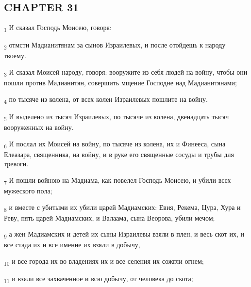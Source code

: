 \subsection{CHAPTER 31}
\begin{tcolorbox}
\textsubscript{1} И сказал Господь Моисею, говоря:
\end{tcolorbox}
\begin{tcolorbox}
\textsubscript{2} отмсти Мадианитянам за сынов Израилевых, и после отойдешь к народу твоему.
\end{tcolorbox}
\begin{tcolorbox}
\textsubscript{3} И сказал Моисей народу, говоря: вооружите из себя людей на войну, чтобы они пошли против Мадианитян, совершить мщение Господне над Мадианитянами;
\end{tcolorbox}
\begin{tcolorbox}
\textsubscript{4} по тысяче из колена, от всех колен Израилевых пошлите на войну.
\end{tcolorbox}
\begin{tcolorbox}
\textsubscript{5} И выделено из тысяч Израилевых, по тысяче из колена, двенадцать тысяч вооруженных на войну.
\end{tcolorbox}
\begin{tcolorbox}
\textsubscript{6} И послал их Моисей на войну, по тысяче из колена, их и Финееса, сына Елеазара, священника, на войну, и в руке его священные сосуды и трубы для тревоги.
\end{tcolorbox}
\begin{tcolorbox}
\textsubscript{7} И пошли войною на Мадиама, как повелел Господь Моисею, и убили всех мужеского пола;
\end{tcolorbox}
\begin{tcolorbox}
\textsubscript{8} и вместе с убитыми их убили царей Мадиамских: Евия, Рекема, Цура, Хура и Реву, пять царей Мадиамских, и Валаама, сына Веорова, убили мечом;
\end{tcolorbox}
\begin{tcolorbox}
\textsubscript{9} а жен Мадиамских и детей их сыны Израилевы взяли в плен, и весь скот их, и все стада их и все имение их взяли в добычу,
\end{tcolorbox}
\begin{tcolorbox}
\textsubscript{10} и все города их во владениях их и все селения их сожгли огнем;
\end{tcolorbox}
\begin{tcolorbox}
\textsubscript{11} и взяли все захваченное и всю добычу, от человека до скота;
\end{tcolorbox}
